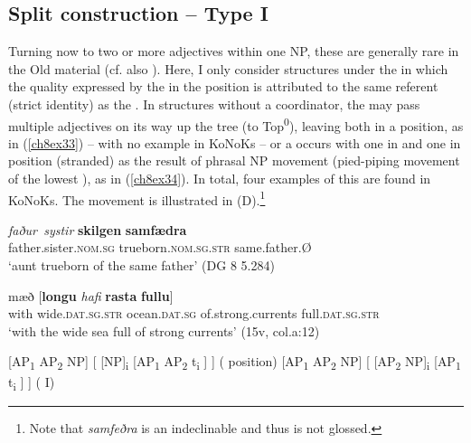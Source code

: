 \documentclass[output=paper,colorlinks,citecolor=brown]{langscibook}
\begin{document}
\subsection{Split construction – Type I}\label{ch8s4.1}\largerpage
Turning now to two or more adjectives within one NP, these are generally
rare in the Old   material (cf. also \citealp[5]{Bech17}). Here,
I only consider structures under the  in which the
quality expressed by the  in the  position
is attributed to the same referent (strict identity) as the 
. In structures without a coordinator, the  may pass
multiple adjectives on its way up the tree (to Top\textsuperscript{0}), leaving both in a
 position, as in (\ref{ch8ex33}) -- with no example in KoNoKs -- or a
 occurs with one  in  and one
 in  position (stranded) as the result of phrasal NP
movement (pied-piping movement of the lowest ), as in (\ref{ch8ex34}). In
total, four examples of this are found in KoNoKs. The movement is
illustrated in (D).\footnote{Note that \emph{samfeðra} is an indeclinable  and thus is not  glossed.} 
 

\begin{exe}
\ex\label{ch8ex33}
\gll \textit{faður~systir} \textbf{skilgen} \textbf{samfædra} \\
father.sister.\textsc{nom.sg} trueborn.\textsc{nom.sg.str} same.father.Ø\\
\glt `aunt trueborn of the same father' (DG 8 5.284)

\ex\label{ch8ex34}
\gll mæð {[}\textbf{longu} \textit{hafi} \textbf{rasta} \textbf{fullu}{]} \\
with wide.\textsc{dat.sg.str} ocean.\textsc{dat.sg} of.strong.currents full.\textsc{dat.sg.str}\\
\glt `with the wide sea full of strong currents' (15v, col.a:12)

 \label{ch8exd}
\begin{xlist}
\ex\label{ch8exda}{[}AP\textsubscript{1} AP\textsubscript{2} NP{]} \rightarrow{}  {[} {[}NP{]}\textsubscript{i} {[}AP\textsubscript{1} AP\textsubscript{2} t\textsubscript{i} {]} {]} \hfill ( position)
\ex\label{ch8exdb}{[}AP\textsubscript{1} AP\textsubscript{2} NP{]} \rightarrow{} {[} {[}AP\textsubscript{2} NP{]}\textsubscript{i} {[}AP\textsubscript{1} t\textsubscript{i} {]} {]} \hfill ( I)
\end{xlist}
\end{exe}
\end{document}
